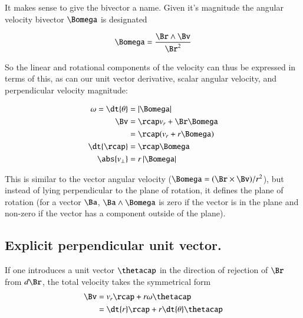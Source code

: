 It makes sense to give the bivector a name.  Given it's magnitude the 
angular velocity bivector $\Bomega$ is designated

\[
\Bomega = \frac{ \Br \wedge \Bv }{\Br^2} 
\]

So the linear and rotational components of the velocity can thus be expressed in terms of this, as can our
unit vector derivative, scalar angular velocity, and perpendicular velocity magnitude:

\begin{align*}
\omega = \dt{\theta} &= \Abs{ \Bomega } \\
\Bv &= \rcap v_r + \Br \Bomega \\
    &= \rcap( v_r + r \Bomega ) \\
\dt{\rcap} &= \rcap \Bomega \\
\abs{v_{\perp}} &= r \Abs{ \Bomega } \\
\end{align*}

This is similar to the vector angular velocity ($\Bomega = (\Br \times \Bv)/r^2$), but instead of lying perpendicular to the
plane of rotation, it defines the plane of rotation (for a vector $\Ba$, $\Ba \wedge \Bomega$ is zero if the vector is in the plane and non-zero if the vector has a component outside of the plane).

%
%
%

\subsection{Explicit perpendicular unit vector.}

If one introduces a unit vector $\thetacap$ in the direction of rejection of $\Br$ from $d\Br$, the total velocity takes the symmetrical form
\begin{align*}
\Bv 
   &= v_r\rcap + r\omega\thetacap \\
   &= \dt{r}\rcap + r\dt{\theta}\thetacap \\
\end{align*}

